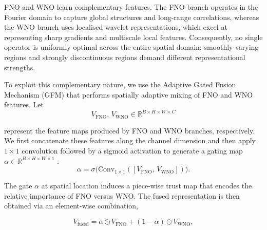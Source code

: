\documentclass[11pt,a4paper]{article}
\begin{document}

FNO and WNO learn complementary features. The FNO branch operates in the Fourier domain to capture global structures and long-range correlations, whereas the WNO branch uses localised wavelet representations, which excel at representing sharp gradients and multiscale local features. Consequently, no single operator is uniformly optimal across the entire spatial domain: smoothly varying regions and strongly discontinuous regions demand different representational strengths.

To exploit this complementary nature, we use the Adaptive Gated Fusion Mechanism (GFM) \cite{liu2025difffno} that performs spatially adaptive mixing of FNO and WNO features. Let 
\[
V_{\text{FNO}},\, V_{\text{WNO}} \in \mathbb{R}^{B \times H \times W \times C}
\]

represent the feature maps produced by FNO and WNO branches, respectively. We first concatenate these features along the channel dimension and then apply $1\times1$ convolution followed by a sigmoid activation to generate a gating map $\alpha \in \mathbb{R}^{B \times H \times W \times 1}$ :
\[
\alpha = \sigma\big(\mathrm{Conv}_{1\times 1}([V_{\text{FNO}},\, V_{\text{WNO}}])\big).
\]

The gate $\alpha$ at spatial location induces a piece-wise trust map that encodes the relative importance of FNO versus WNO. The fused representation is then obtained via an element-wise combination,

\[
V_{\text{fused}} = \alpha \odot V_{\text{FNO}} + (1 - \alpha) \odot V_{\text{WNO}},
\]
\end{document}
